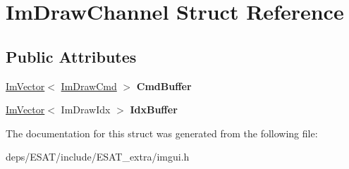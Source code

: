 \hypertarget{struct_im_draw_channel}{}\section{Im\+Draw\+Channel Struct Reference}
\label{struct_im_draw_channel}
\subsection*{Public Attributes}
\begin{DoxyCompactItemize}
\item 
\mbox{\label{struct_im_draw_channel_abdaa17053d55fb6757c1971d410ceddf}} 
\mbox{\hyperlink{class_im_vector}{Im\+Vector}}$<$ \mbox{\hyperlink{struct_im_draw_cmd}{Im\+Draw\+Cmd}} $>$ {\bfseries Cmd\+Buffer}
\item 
\mbox{\label{struct_im_draw_channel_a7fbed7d3523124fadd94859d5ac0fd67}} 
\mbox{\hyperlink{class_im_vector}{Im\+Vector}}$<$ Im\+Draw\+Idx $>$ {\bfseries Idx\+Buffer}
\end{DoxyCompactItemize}


The documentation for this struct was generated from the following file\+:\begin{DoxyCompactItemize}
\item 
deps/\+E\+S\+A\+T/include/\+E\+S\+A\+T\+\_\+extra/imgui.\+h\end{DoxyCompactItemize}

